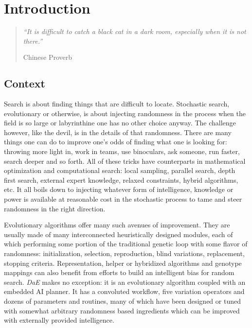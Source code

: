 \documentclass[english]{DESCARWINreport}
\begin{document}
\tableofcontents

\newpage

\chapter{Introduction}

\begin{quotation}
\emph{``It is difficult to catch a black cat in a dark room, especially when it is not there.''}
\begin{flushright}
Chinese Proverb

\end{flushright}
\end{quotation}

\vspace{0cm}

\section{Context}

Search is about finding things that are difficult to locate. Stochastic search, evolutionary or otherwise, is about injecting randomness in the process when the field is so large or labyrinthine one has no other choice anyway. The challenge however, like the devil, is in the details of that randomness. There are many things one can do to improve one's odds of finding what one is looking for: throwing more light in, work in teams, use binoculars, ask someone, run faster, search deeper and so forth. All of these tricks have counterparts in mathematical optimization and computational search: local sampling, parallel search, depth first search, external expert knowledge, relaxed constraints, hybrid algorithms, etc. It all boils down to injecting whatever form of intelligence, knowledge or power is available at reasonable cost in the stochastic process to tame and steer randomness in the right direction.

Evolutionary algorithms offer many such avenues of improvement. They are usually made of many interconnected heuristically designed modules, each of which performing some portion of the traditional genetic loop with some flavor of randomness: initialization, selection, reproduction, blind variations, replacement, stopping criteria. Representation, helper or hybridized algorithms and genotype mappings can also benefit from efforts to build an intelligent bias for random search. \emph{DaE} makes no exception: it is an evolutionary algorithm coupled with an embedded AI planner. It has a convoluted workflow, five variation operators and dozens of parameters and routines, many of which have been designed or tuned with somewhat arbitrary randomness based ingredients which can be improved with externally provided intelligence.
\end{document}
